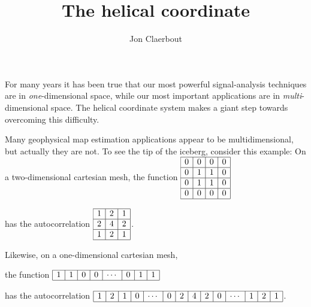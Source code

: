 
\title{The helical coordinate}
\author{Jon Claerbout}
\maketitle
\label{paper:hlx}

For many years it has been true that
our most powerful signal-analysis techniques
are in {\em  one}-dimensional space,
while our most important applications are in {\em  multi}-dimensional space.
The helical coordinate system makes a giant step
towards overcoming this difficulty.

\par
Many geophysical map estimation applications appear to be multidimensional,
but actually they are not.
To see the tip of the iceberg, consider this example:
On a two-dimensional cartesian mesh, the function
$
\begin{array}{|r|r|r|r|}
        \hline
        0 & 0 & 0 &0 \\
        \hline
        0 & 1 & 1 &0 \\
        \hline
        0 & 1 & 1 &0 \\
        \hline
        0 & 0 & 0 &0 \\
        \hline
\end{array}
$
\par\noindent
has the autocorrelation
$
\begin{array}{|r|r|r|} \hline
        1 & 2 & 1\\
        \hline
        2 & 4 & 2\\
        \hline
        1 & 2 & 1
        \\ \hline
\end{array}
$.

\par\noindent
Likewise, on a one-dimensional cartesian mesh,
\par\noindent
the function $
\begin{array}{|r|r|r|r|r|r|r|r|r|r|r|r|r|} \hline
 1&1&0&0& \cdots& 0& 1&1
        \\ \hline
\end{array}
$
\par\noindent
has the autocorrelation
$ %
\begin{array}{|r|r|r|r|r|r|r|r|r|r|r|r|r|r|r|r|r|r|r|} \hline
 1&2&1&0&\cdots&0&2&4&2&0&\cdots&1&2&1
        \\ \hline
\end{array}
$.


